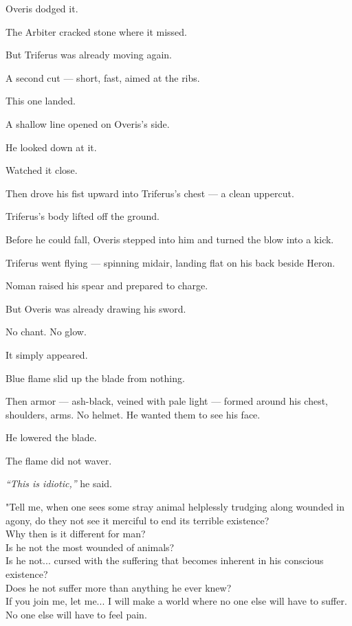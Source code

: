 \documentclass[12pt]{article}
\begin{document}
Overis dodged it.

The Arbiter cracked stone where it missed.

But Triferus was already moving again.

A second cut — short, fast, aimed at the ribs.

This one landed.

A shallow line opened on Overis’s side.

He looked down at it.

Watched it close.

Then drove his fist upward into Triferus’s chest — a clean uppercut.

Triferus’s body lifted off the ground.

Before he could fall, Overis stepped into him and turned the blow into a kick.

Triferus went flying — spinning midair, landing flat on his back beside Heron.

Noman raised his spear and prepared to charge.

But Overis was already drawing his sword.

\bigskip

No chant. No glow.

It simply appeared.

Blue flame slid up the blade from nothing.

Then armor — ash-black, veined with pale light — formed around his chest, shoulders, arms. No helmet. He wanted them to see his face.

He lowered the blade.

The flame did not waver.

\textit{“This is idiotic,”} he said.

"Tell me, when one sees some stray animal helplessly trudging along wounded in agony, do they not see it merciful to end its terrible existence?\\

Why then is it different for man?\\

Is he not the most wounded of animals?\\

Is he not... cursed with the suffering that becomes inherent in his conscious existence?\\

Does he not suffer more than anything he ever knew?\\

If you join me, let me... I will make a world where no one else will have to suffer. No one else will have to feel pain.\\
\end{document}
